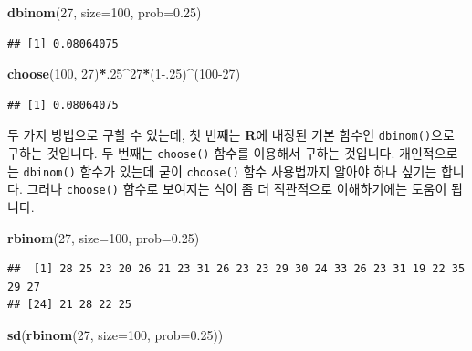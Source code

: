 \documentclass[]{book}
\newenvironment{Shaded}{\begin{snugshade}}{\end{snugshade}}
\newcommand{\DataTypeTok}[1]{\textcolor[rgb]{0.13,0.29,0.53}{#1}}
\newcommand{\DecValTok}[1]{\textcolor[rgb]{0.00,0.00,0.81}{#1}}
\newcommand{\FloatTok}[1]{\textcolor[rgb]{0.00,0.00,0.81}{#1}}
\newcommand{\KeywordTok}[1]{\textcolor[rgb]{0.13,0.29,0.53}{\textbf{#1}}}
\newcommand{\NormalTok}[1]{#1}
\newcommand{\OperatorTok}[1]{\textcolor[rgb]{0.81,0.36,0.00}{\textbf{#1}}}
\begin{document}
\begin{Shaded}
\begin{Highlighting}[]
\KeywordTok{dbinom}\NormalTok{(}\DecValTok{27}\NormalTok{, }\DataTypeTok{size=}\DecValTok{100}\NormalTok{, }\DataTypeTok{prob=}\FloatTok{0.25}\NormalTok{)}
\end{Highlighting}
\end{Shaded}

\begin{verbatim}
## [1] 0.08064075
\end{verbatim}

\begin{Shaded}
\begin{Highlighting}[]
\KeywordTok{choose}\NormalTok{(}\DecValTok{100}\NormalTok{, }\DecValTok{27}\NormalTok{)}\OperatorTok{*}\NormalTok{.}\DecValTok{25}\OperatorTok{^}\DecValTok{27}\OperatorTok{*}\NormalTok{(}\DecValTok{1}\FloatTok{-.25}\NormalTok{)}\OperatorTok{^}\NormalTok{(}\DecValTok{100-27}\NormalTok{)}
\end{Highlighting}
\end{Shaded}

\begin{verbatim}
## [1] 0.08064075
\end{verbatim}

두 가지 방법으로 구할 수 있는데, 첫 번째는 \textbf{R}에 내장된 기본 함수인 \texttt{dbinom()}으로 구하는 것입니다. 두 번째는 \texttt{choose()} 함수를 이용해서 구하는 것입니다. 개인적으로는 \texttt{dbinom()} 함수가 있는데 굳이 \texttt{choose()} 함수 사용법까지 알아야 하나 싶기는 합니다. 그러나 \texttt{choose()} 함수로 보여지는 식이 좀 더 직관적으로 이해하기에는 도움이 됩니다.

\begin{Shaded}
\begin{Highlighting}[]
\KeywordTok{rbinom}\NormalTok{(}\DecValTok{27}\NormalTok{, }\DataTypeTok{size=}\DecValTok{100}\NormalTok{, }\DataTypeTok{prob=}\FloatTok{0.25}\NormalTok{)}
\end{Highlighting}
\end{Shaded}

\begin{verbatim}
##  [1] 28 25 23 20 26 21 23 31 26 23 23 29 30 24 33 26 23 31 19 22 35 29 27
## [24] 21 28 22 25
\end{verbatim}

\begin{Shaded}
\begin{Highlighting}[]
\KeywordTok{sd}\NormalTok{(}\KeywordTok{rbinom}\NormalTok{(}\DecValTok{27}\NormalTok{, }\DataTypeTok{size=}\DecValTok{100}\NormalTok{, }\DataTypeTok{prob=}\FloatTok{0.25}\NormalTok{))}
\end{Highlighting}
\end{Shaded}
\end{document}
